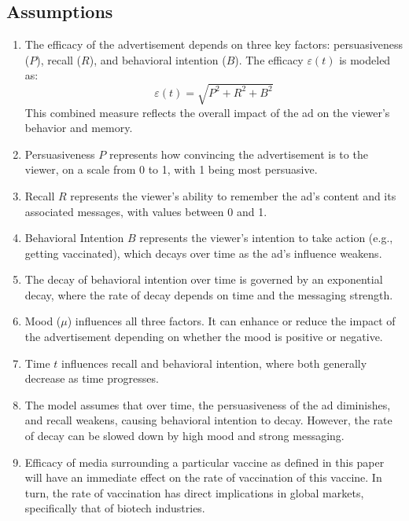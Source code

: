 \documentclass[12pt,a4paper]{article}
\begin{document}
\subsection{Assumptions}
\begin{enumerate}
    \item The efficacy of the advertisement depends on three key factors: persuasiveness (\( P \)), recall (\( R \)), and behavioral intention (\( B \)). The efficacy \( \varepsilon(t) \) is modeled as:
    \[
    \varepsilon(t) = \sqrt{P^2 + R^2 + B^2}
    \]
    This combined measure reflects the overall impact of the ad on the viewer's behavior and memory.
    
    \item Persuasiveness \( P \) represents how convincing the advertisement is to the viewer, on a scale from 0 to 1, with 1 being most persuasive.

    \item Recall \( R \) represents the viewer's ability to remember the ad's content and its associated messages, with values between 0 and 1.

    \item Behavioral Intention \( B \) represents the viewer's intention to take action (e.g., getting vaccinated), which decays over time as the ad's influence weakens.

    \item The decay of behavioral intention over time is governed by an exponential decay, where the rate of decay depends on time and the messaging strength.
    
    \item Mood (\( \mu \)) influences all three factors. It can enhance or reduce the impact of the advertisement depending on whether the mood is positive or negative.

    \item Time \( t \) influences recall and behavioral intention, where both generally decrease as time progresses.
    
    \item The model assumes that over time, the persuasiveness of the ad diminishes, and recall weakens, causing behavioral intention to decay. However, the rate of decay can be slowed down by high mood and strong messaging.

    \item Efficacy of media surrounding a particular vaccine as defined in this paper will have an immediate effect on the rate of vaccination of this vaccine. In turn, the rate of vaccination has direct implications in global markets, specifically that of biotech industries.

\end{enumerate}
\end{document}
